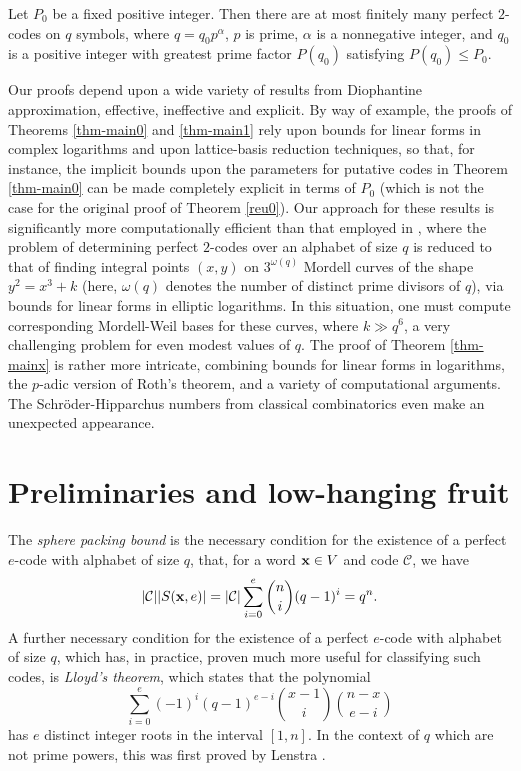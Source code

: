 \documentclass{amsart}
\begin{document}
 \begin{thm} \label{thm-main!}
Let $P_0$ be a fixed positive integer. Then there are at most finitely many perfect $2$-codes on $q$ symbols, where $q=q_0 p^\alpha$,  $p$ is prime, $\alpha$ is a nonnegative integer, and $q_0$ is a positive integer with greatest prime factor $P(q_0)$ satisfying $P(q_0) \leq P_0$.
\end{thm}



Our proofs depend upon a wide variety of results from Diophantine approximation, effective, ineffective and explicit. By way of example, the proofs of Theorems \ref{thm-main0} and \ref{thm-main1} rely upon bounds for linear forms in complex logarithms and upon lattice-basis reduction techniques, so that, for instance, the implicit bounds upon the parameters for putative codes in Theorem \ref{thm-main0} can be made completely explicit in terms of $P_0$ (which is not the case for the original proof of Theorem \ref{reu0}). Our approach for these results is significantly more
computationally efficient than that employed in \cite{CG}, where the problem of determining perfect $2$-codes over an alphabet of size $q$ is reduced to that of finding integral points $(x,y)$ on  $3^{\omega (q)}$ Mordell curves of the shape $y^2=x^3+k$ (here, $\omega (q)$ denotes the number of distinct prime divisors of $q$), via bounds for linear forms in elliptic logarithms. In this situation, one must compute corresponding Mordell-Weil bases for these curves, where $k \gg q^6$, a very challenging problem for even modest values of $q$. The proof of Theorem \ref{thm-mainx} is rather more intricate, combining bounds for linear forms in  logarithms, the $p$-adic version of Roth's theorem, and a variety of computational arguments. The Schr\"oder-Hipparchus numbers from classical combinatorics even make an unexpected appearance.

\section{Preliminaries and low-hanging fruit} \label{Sec2}

The {\it sphere packing bound} is the necessary condition for the existence of a perfect $e$-code with alphabet of size $q$, that,  for a word ${\bf{x}} \in V$ and code $\mathcal{C}$, we have
$$
 |\mathcal{C} | |S({\bf{x}},e)| =  |\mathcal{C} | \sum_{i=0}^e \binom{n}{i} (q-1)^i 
  =q^n.
 $$
 A further necessary condition for the existence of a perfect $e$-code with alphabet of size $q$, which has, in practice, proven much more useful for classifying such codes, is {\it Lloyd's theorem}, 
 which states that the polynomial
 $$
 \sum_{i=0}^e (-1)^i (q-1)^{e-i} \binom{x-1}{i} \binom{n-x}{e-i}
 $$
 has $e$ distinct integer roots in the interval $[1,n]$. In the context of $q$ which are not prime powers, this was first proved by Lenstra  \cite{Len}. 
 
\end{document}
